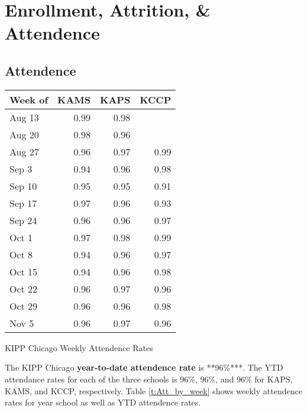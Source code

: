 \documentclass[sfsidenotes, justified]{tufte-handout}\usepackage{graphicx, color}
\begin{document}
\section{Enrollment, Attrition, \& Attendence}
\subsection{Attendence} 









\begin{margintable}

{\small
\begin{tabular}{lrrr}
  \hline
Week of & KAMS & KAPS & KCCP \\ 
  \hline
Aug 13 & 0.99 & 0.98 &  \\ 
  Aug 20 & 0.98 & 0.96 &  \\ 
  Aug 27 & 0.96 & 0.97 & 0.99 \\ 
  Sep 3 & 0.94 & 0.96 & 0.98 \\ 
  Sep 10 & 0.95 & 0.95 & 0.91 \\ 
  Sep 17 & 0.97 & 0.96 & 0.93 \\ 
  Sep 24 & 0.96 & 0.96 & 0.97 \\ 
  Oct 1 & 0.97 & 0.98 & 0.99 \\ 
  Oct 8 & 0.94 & 0.96 & 0.97 \\ 
  Oct 15 & 0.94 & 0.96 & 0.98 \\ 
  Oct 22 & 0.96 & 0.97 & 0.96 \\ 
  Oct 29 & 0.96 & 0.96 & 0.98 \\ 
  Nov 5 & 0.96 & 0.97 & 0.96 \\ 
   \hline
\end{tabular}
}



\caption{KIPP Chicago Weekly Attendence Rates}
\end{margintable}



The KIPP Chicago \textbf{year-to-date attendence rate} is **96\%***. The YTD attendance rates for each of the three schools is 96\%, 96\%, and 96\% for KAPS, KAMS, and KCCP, respectively.   Table \ref{t:Att_by_week} shows weekly attendence rates for year school as well as YTD attendence rates. 
\end{document}
